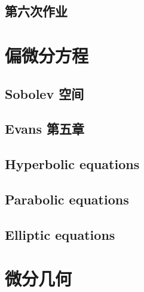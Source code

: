 \documentclass[
	leqno, %
	a4paper, %
	fontsize=12pt, %
	twoside=false, %
	open=any, %
	chapterentrydots=true, %
	numbers=noenddot, %
    UTF-8, %
	toc=nottotoc,
	BCOR=12mm,
	DIV=calc,
]{styles/kaobook}
\begin{document}
\section{第六次作业}


% 
% 
% 



\setchapterpreamble[u]{\margintoc}
\chapter{偏微分方程}
\section{Sobolev 空间}

\section{Evans 第五章}

\section{Hyperbolic equations}

\section{Parabolic equations}

\section{Elliptic equations}


\setchapterpreamble[u]{\margintoc}
\chapter{微分几何}





\end{document}
